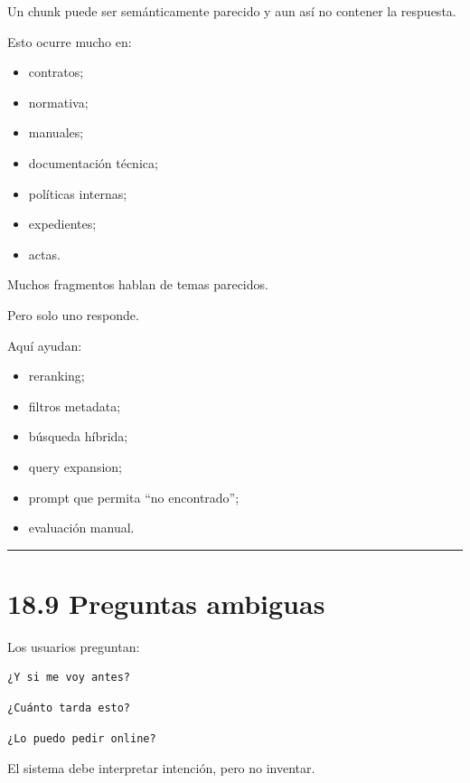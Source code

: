 Un chunk puede ser semánticamente parecido y aun así no contener la
respuesta.

Esto ocurre mucho en:

\begin{itemize}
\tightlist
\item
  contratos;
\item
  normativa;
\item
  manuales;
\item
  documentación técnica;
\item
  políticas internas;
\item
  expedientes;
\item
  actas.
\end{itemize}

Muchos fragmentos hablan de temas parecidos.

Pero solo uno responde.

Aquí ayudan:

\begin{itemize}
\tightlist
\item
  reranking;
\item
  filtros metadata;
\item
  búsqueda híbrida;
\item
  query expansion;
\item
  prompt que permita ``no encontrado'';
\item
  evaluación manual.
\end{itemize}

\begin{center}\rule{0.5\linewidth}{0.5pt}\end{center}

\section{18.9 Preguntas ambiguas}\label{preguntas-ambiguas}

Los usuarios preguntan:

\begin{lstlisting}
¿Y si me voy antes?
\end{lstlisting}

\begin{lstlisting}
¿Cuánto tarda esto?
\end{lstlisting}

\begin{lstlisting}
¿Lo puedo pedir online?
\end{lstlisting}

El sistema debe interpretar intención, pero no inventar.

